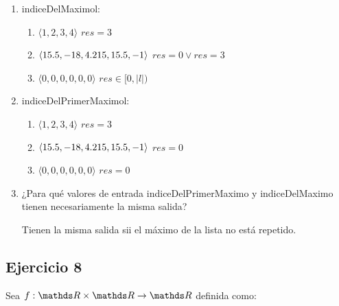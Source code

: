 \begin{enumerate}[label=\alph*)]
      \item \begin{proc}{indiceDelMaximo}{\In l: \TLista{\float}}{\ent}
            \end{proc}

            \begin{enumerate}[label=\roman*)]
                  \item $\langle 1, 2, 3, 4 \rangle$ $res = 3$
                  \item $\langle 15 \text{.} 5, -18, 4 \text{.} 215, 15 \text{.} 5, -1 \rangle$ $res = 0 \lor res = 3$
                  \item $\langle 0, 0, 0, 0, 0, 0 \rangle$ $res \in [0, |l|)$
            \end{enumerate}

      \item \begin{proc}{indiceDelPrimerMaximo}{\In l: \TLista{\float}}{\ent}
            \end{proc}

            \begin{enumerate}[label=\roman*)]
                  \item $\langle 1, 2, 3, 4 \rangle$ $res = 3$
                  \item $\langle 15 \text{.} 5, -18, 4 \text{.} 215, 15 \text{.} 5, -1 \rangle$ $res = 0$
                  \item $\langle 0, 0, 0, 0, 0, 0 \rangle$ $res = 0$
            \end{enumerate}

      \item ¿Para qué valores de entrada indiceDelPrimerMaximo y indiceDelMaximo tienen necesariamente la misma salida?

            Tienen la misma salida sii el máximo de la lista no está repetido.
\end{enumerate}

\subsection{Ejercicio 8}
Sea $f: \float  \times \float  \to \float$ definida como:

